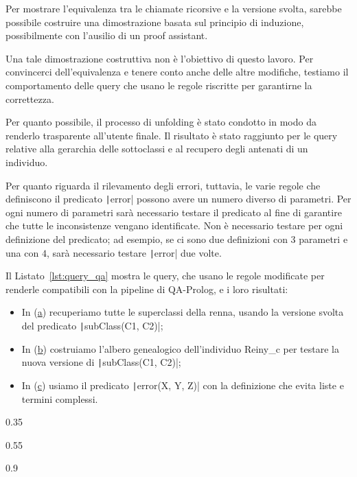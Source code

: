 Per mostrare l'equivalenza tra le chiamate ricorsive e la versione svolta, sarebbe possibile costruire una dimostrazione basata sul principio di induzione, possibilmente con l'ausilio di un proof assistant.

Una tale dimostrazione costruttiva non è l'obiettivo di questo lavoro. Per convincerci dell'equivalenza e tenere conto anche delle altre modifiche, testiamo il comportamento delle query che usano le regole riscritte per garantirne la correttezza.

Per quanto possibile, il processo di unfolding è stato condotto in modo da renderlo trasparente all'utente finale. Il risultato è stato raggiunto per le query relative alla gerarchia delle sottoclassi e al recupero degli antenati di un individuo.

Per quanto riguarda il rilevamento degli errori, tuttavia, le varie regole che definiscono il predicato \texttt|error| possono avere un numero diverso di parametri. Per ogni numero di parametri sarà necessario testare il predicato al fine di garantire che tutte le inconsistenze vengano identificate. Non è necessario testare per ogni definizione del predicato; ad esempio, se ci sono due definizioni con $3$ parametri e una con $4$, sarà necessario testare \texttt|error| due volte.

Il Listato~\ref{lst:query_qa} mostra le query, che usano le regole modificate per renderle compatibili con la pipeline di QA-Prolog, e i loro risultati:
\begin{itemize}
	\item In (\hyperref[lst:query_subclass]{a}) recuperiamo tutte le superclassi della renna, usando la versione svolta del predicato \texttt|subClass(C1, C2)|;
	\item In (\hyperref[lst:query_ancestor]{b}) costruiamo l'albero genealogico dell'individuo Reiny\_c per testare la nuova versione di \texttt|subClass(C1, C2)|;
	\item In (\hyperref[lst:query_error]{c}) usiamo il predicato \texttt|error(X, Y, Z)| con la definizione che evita liste e termini complessi.
\end{itemize}

\begin{listingenv}[h]
	\centering
	\begin{sublisting}[c]{0.35\linewidth}
		\caption{Sottoclassi}
		\label{lst:query_subclass}
	\end{sublisting}
	\qquad
	\begin{sublisting}[c]{0.55\linewidth}
		\caption{Antenato}
		\label{lst:query_ancestor}
	\end{sublisting}
	
	\vspace{.2cm}
	\begin{sublisting}[c]{0.9\linewidth}
		\caption{Errore}
		\label{lst:query_error}
	\end{sublisting}
	\caption{Risultati delle query}
	\label{lst:query_qa}
\end{listingenv}

